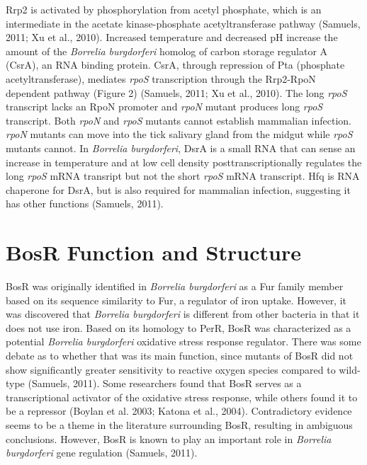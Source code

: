 \documentclass[12pt,twoside]{reedthesis}
\begin{document}
		
		Rrp2 is activated by phosphorylation from acetyl phosphate, which is an intermediate in the acetate kinase-phosphate acetyltransferase pathway (Samuels, 2011; Xu et al., 2010). Increased temperature and decreased pH increase the amount of the \textit{Borrelia burgdorferi} homolog of carbon storage regulator A (CsrA), an RNA binding protein. CsrA, through repression of Pta (phosphate acetyltransferase), mediates \textit{rpoS} transcription through the Rrp2-RpoN dependent pathway (Figure 2) (Samuels, 2011; Xu et al., 2010). The long \textit{rpoS} transcript lacks an RpoN promoter and \textit{rpoN} mutant produces long \textit{rpoS} transcript. Both \textit{rpoN} and \textit{rpoS} mutants cannot establish mammalian infection. \textit{rpoN} mutants can move into the tick salivary gland from the midgut while \textit{rpoS} mutants cannot. In \textit{Borrelia burgdorferi}, DsrA is a small RNA that can sense an increase in temperature and at low cell density posttranscriptionally regulates the long \textit{rpoS} mRNA transript but not the short \textit{rpoS} mRNA transcript. Hfq is RNA chaperone for DsrA, but is also required for mammalian infection, suggesting it has other functions (Samuels, 2011). 
		
		
		\section{BosR Function and Structure}
		
	  BosR was originally identified in \textit{Borrelia burgdorferi} as a Fur family member based on its sequence similarity to Fur, a regulator of iron uptake. However, it was discovered that \textit{Borrelia burgdorferi} is different from other bacteria in that it does not use iron. Based on its homology to PerR, BosR was characterized as a potential \textit{Borrelia burgdorferi} oxidative stress response regulator. There was some debate as to whether that was its main function, since mutants of BosR did not show significantly greater sensitivity to reactive oxygen species compared to wild-type (Samuels, 2011). Some researchers found that BosR serves as a transcriptional activator of the oxidative stress response, while others found it to be a repressor (Boylan et al. 2003;  Katona et al., 2004). Contradictory evidence seems to be a theme in the literature surrounding BosR, resulting in ambiguous conclusions. However, BosR is known to play an important role in \textit{Borrelia burgdorferi} gene regulation (Samuels, 2011). 
		
\end{document}
